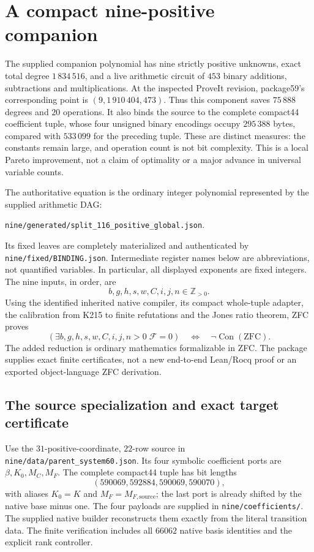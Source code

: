\section{A compact nine-positive companion}
\label{sec:compact-nine}

The supplied companion polynomial has nine strictly positive unknowns,
exact total degree $1\,834\,516$, and a live arithmetic circuit of $453$
binary additions, subtractions and multiplications.  At the inspected
ProveIt revision, package59's corresponding point is
$(9,1\,910\,404,473)$.  Thus this component saves $75\,888$ degrees and
$20$ operations.  It also binds the source to the complete compact44
coefficient tuple, whose four unsigned binary encodings occupy
$295\,388$ bytes, compared with $533\,099$ for the preceding tuple.
These are distinct measures: the constants remain large, and operation
count is not bit complexity.  This is a local Pareto improvement, not a
claim of optimality or a major advance in universal variable counts.

The authoritative equation is the ordinary integer polynomial represented
by the supplied arithmetic DAG:
\begin{center}
\small\texttt{nine/generated/split\_116\_positive\_global.json}.
\end{center}
Its fixed
leaves are completely materialized and authenticated by
\texttt{nine/fixed/BINDING.json}.  Intermediate register names below are
abbreviations, not quantified variables.  In particular, all displayed
exponents are fixed integers.  The nine inputs, in order, are
\[
 b,g,h,s,w,C,i,j,n\in\mathbb Z_{>0}.
\]
Using the identified inherited native compiler, its compact whole-tuple
adapter, the calibration from K215 to finite refutations and the Jones ratio theorem,
ZFC proves
\[
 (\exists b,g,h,s,w,C,i,j,n>0\;\mathcal F=0)
 \quad\Longleftrightarrow\quad \neg\operatorname{Con}(\mathrm{ZFC}).
\]
The added reduction is ordinary mathematics formalizable in ZFC.  The
package supplies exact finite certificates, not a new end-to-end
Lean/Rocq proof or an exported object-language ZFC derivation.

\subsection{The source specialization and exact target certificate}

Use the $31$-positive-coordinate, $22$-row source in
\texttt{nine/data/parent\_system60.json}.  Its four symbolic coefficient
ports are $\beta,K_0,M_C,M_F$.  The complete compact44 tuple has bit
lengths
\[
 (590069,592884,590069,590070),
\]
with aliases $K_0=K$ and $M_F=M_{F,\mathrm{source}}$; the last port is
already shifted by the native base minus one.  The four payloads are
supplied in \texttt{nine/coefficients/}.  The supplied native builder
reconstructs them exactly from the literal transition data.  The finite
verification includes all $66062$ native basis identities and the
explicit rank controller.

